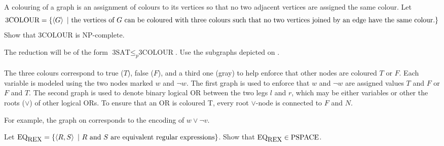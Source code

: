\documentclass{article}
\begin{document}
\begin{exercise}
A colouring of a graph is an assignment of colours to its vertices so that no two adjacent vertices are assigned the same colour. Let
\begin{equation}
\mbox{3COLOUR}=\left\{ \left\langle G \right\rangle\ |\ \mbox{the vertices of $G$ can be coloured with three colours such that no two vertices joined by an edge have the same colour.} \right\}
\end{equation}
Show that $\mbox{3COLOUR}$ is $\mbox{NP-complete}$.
\begin{hint}
The reduction will be of the form $\mbox{3SAT}\leq_p\mbox{3COLOUR}$. Use the subgraphs depicted on .
\paragraph{}
The three colours correspond to true ($T$), false ($F$), and a third one (gray) to help enforce that other nodes are coloured $T$ or $F$. Each variable is modeled using the two nodes marked $w$ and $\neg w$. The first graph is used to enforce that $w$ and $\neg w$ are assigned values $T$ and $F$ or $F$ and $T$. The second graph is used to denote binary logical OR between the two legs $l$ and $r$, which may be either variables or other the roots ($\vee$) of other logical ORs. To ensure that an OR is coloured T, every root $\vee$-node is connected to $F$ and $N$.
\begin{example}
For example, the graph on  corresponds to the encoding of $w\vee\neg v$.
\end{example}
\end{hint}
\end{exercise}

\begin{exercise}
Let $\mbox{EQ}_{\mbox{\small{REX}}}=\left\{ \left\langle R,S \right\rangle\ |\ \mbox{$R$ and $S$ are equivalent regular expressions} \right\}$. Show that $\mbox{EQ}_{\mbox{\small{REX}}}\in\mbox{PSPACE}$.
\end{exercise}
\end{document}
